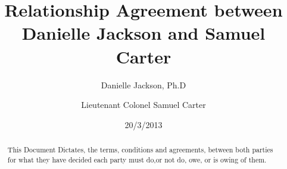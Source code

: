 






\title{Relationship Agreement between Danielle Jackson and Samuel Carter}
\author{ Danielle Jackson, Ph.D \and Lieutenant Colonel Samuel Carter }
\date{20/3/2013}
\maketitle
 \begin{abstract}
This Document Dictates, the terms, conditions and agreements, between both parties for what they have decided  
each party must do,or not do, owe, or is owing of them.
 \end{abstract}


